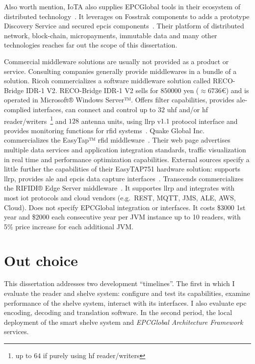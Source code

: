 Also worth mention, IoTA also supplies EPCGlobal tools in their ecosystem of distributed technology~\cite{GlobalTradeSupply}. It leverages on Fosstrak components to adds a prototype Discovery Service and secured \ac{epcis} components~\cite{FosstrakSimilarProjects}. Their platform of distributed network, block-chain, micropayments, immutable data and many other technologies reaches far out the scope of this dissertation.

Commercial middleware solutions are usually not provided as a product or service. Consulting companies generally provide middlewares in a bundle of a solution.
Ricoh commercializes a software middleware solution called RECO-Bridge IDR-1 V2. RECO-Bridge IDR-1 V2 sells for $850000$ yen ($\approx 6736$€) and is operated in Microsoft® Windows Server™. Offers filter capabilities, provides \ac{ale}-complied interfaces, can connect and control up to $32$ \ac{uhf} and/or \ac{hf} reader/writers~\footnote{up to $64$ if purely using \ac{hf} reader/writers} and $128$ antenna units, using \ac{llrp} v$1.1$ protocol interface and provides monitoring functions for \ac{rfid} systems~\cite{RECOBridgeIDR1V2}.
Quake Global Inc. commercializes the EasyTap™ \ac{rfid} middleware~\cite{EasyTAPRealTime}. Their web page advertises multiple data services and application integration standards, traffic visualization in real time and performance optimization capabilities. External sources specify a little further the capabilities of their EasyTAP751 hardware solution: supports \ac{llrp}, provides \ac{ale} and \ac{epcis} data capture interfaces~\cite{RFIDEasyTAPTag}.
Transcends commercializes the RIFIDI® Edge Server middleware~\cite{RIFIDIEdgeServer2015}. It supportes \ac{llrp} and integrates with most \ac{iot} protocols and cloud vendors (e.g.\ REST, MQTT, JMS, ALE, AWS, Cloud). Does not specify EPCGlobal integration or interfaces. It costs \$$3000$ 1st year and \$$2000$ each consecutive year per JVM instance up to 10 readers, with 5\% price increase for each additional JVM.

\section{Out choice} \label{sec:ourchoice}

This dissertation addresses two development ``timelines''. The first in which I evaluate the reader and shelve system: configure and test its capabilities, examine performance of the shelve system, interact with its interfaces. I also evaluate \ac{epc} encoding, decoding and translation software.
In the second period, the local deployment of the smart shelve system and \emph{EPCGlobal Architecture Framework} services.

